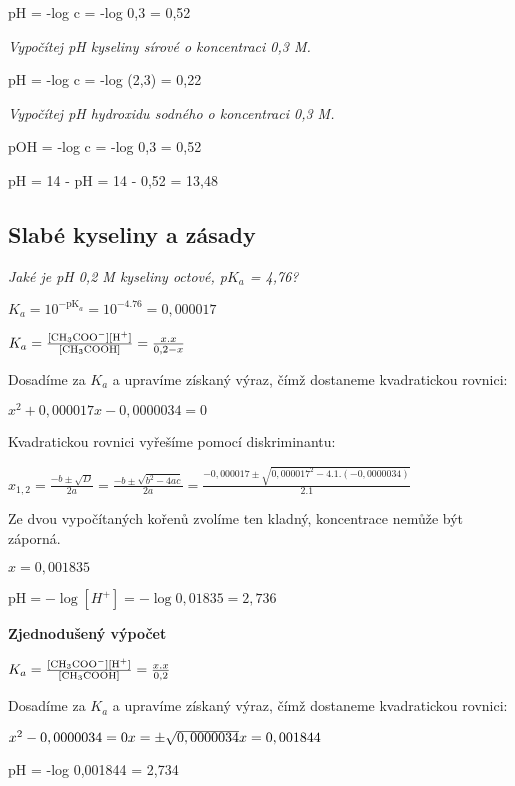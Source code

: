 
pH = -log c = -log 0,3 = 0,52

\textit{Vypočítej pH kyseliny sírové o koncentraci 0,3 M.}


pH = -log c = -log (2,3) = 0,22

\textit{Vypočítej pH hydroxidu sodného o koncentraci 0,3 M.}


pOH = -log c = -log 0,3 = 0,52

pH = 14 - pH = 14 - 0,52 = 13,48

\newpage

\subsection{Slabé kyseliny a zásady}
\emph{Jaké je pH 0,2 M kyseliny octové, p$K_a$ = 4,76?}


$K_a = 10^{-\textrm{pK}_a} = 10^{-4.76} = 0,000017$

$K_a = \frac{[\ce{CH3COO^-}][\ce{H^+}]}{[\ce{CH3COOH}]} = \frac{x.x}{0,2-x}$

Dosadíme za $K_a$ a upravíme získaný výraz, čímž dostaneme kvadratickou rovnici:

$x^2 + 0,000017x - 0,0000034 = 0$

Kvadratickou rovnici vyřešíme pomocí diskriminantu:

$x_{1,2} = \frac{-b \pm \sqrt{D}}{2a} = \frac{-b \pm \sqrt{b^2 - 4ac}}{2a} = \frac{-0,000017 \pm \sqrt{0,000017^2 - 4.1.(-0,0000034)}}{2.1}$

Ze dvou vypočítaných kořenů zvolíme ten kladný, koncentrace nemůže být záporná.

$x = 0,001835$

$\textrm{pH} = -\log[H^+] = -\log0,01835 = 2,736$

\textbf{Zjednodušený výpočet}

$K_a = \frac{[\ce{CH3COO^-}][\ce{H^+}]}{[\ce{CH3COOH}]} = \frac{x.x}{0,2}$

Dosadíme za $K_a$ a upravíme získaný výraz, čímž dostaneme kvadratickou rovnici:

$x^2 - 0,0000034 = 0\\
x = \pm\sqrt{0,0000034}\\
x = 0,001844$

pH = -log 0,001844 = 2,734

